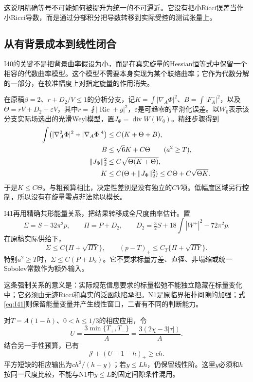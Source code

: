 \documentclass[UTF8,fontset=fandol,zihao=-4,a4paper]{ctexart}
\theoremstyle{remark}
\DeclareMathOperator{\Ric}{Ric}
\DeclareMathOperator{\diver}{div}
\newcommand{\J}{\mathcal J}
\newcommand{\avg}{\mathop{\fint}}
\begin{document}
这说明精确等号不可能如何被提升为统一的不可逼近。它没有把小Ricci误差当作小Ricci导数，而是通过分部积分把导数转移到实际受控的测试张量上。

\subsection{从有背景成本到线性闭合}

I40的关键不是把背景曲率假设为小，而是在真实旋量的Hessian恒等式中保留一个相容的代数曲率模型。这个模型不需要本身实现为某个联络曲率；它作为代数分解的一部分，在校准幅度上对指定旋量的作用消失。

在原稿$\beta=2$、$r+D_2/V\le1$的分析分支，记$K=\int|\nabla_A\Phi|^2$、$B=\int|F_A^-|^2$，以及$\Theta=rV+D_2+\varepsilon V$，其中$r=\avg|\Ric+g|^2$，$\varepsilon$是可趋零的平滑化误差。以$W_0$表示该分支实际场选出的光滑Weyl模型，置$J_\Phi=\diver W(W_0)$。精细步骤得到
\begin{align}
\int\bigl(|\nabla_A^2\Phi|^2+|\nabla_A\Phi|^4\bigr)
&\le C(K+\Theta+B),\notag\\
B&\le\sqrt6K+C\Theta\qquad(a^2\ge T),\notag\\
\|J_\Phi\|_2^2&\le C\sqrt{\Theta(K+\Theta)},\notag\\
K&\le C(\Theta+\|J_\Phi\|_2^2)\le C\Theta+C\sqrt{\Theta K}.
\label{eq:bootstrap}
\end{align}
于是$K\le C\Theta$。与粗预算相比，决定性差别是没有独立的$CV$项。低幅度区域另行控制，所以没有在旋量零点非法除以模长。

I41再用精确共形能量关系，把结果转移成全尺度曲率估计。置
\[
\Sigma=S-32\pi^2p,\qquad \Pi=P+D_2,
\qquad D_2=\tfrac32S+18\int|W^+|^2-72\pi^2p.
\]
在原稿实际供给下，
\begin{equation}
\boxed{\Sigma\le C\{\Pi+\sqrt{\Pi Y}\},\qquad
(p-T)_+\le C_T\{\Pi+\sqrt{\Pi Y}\}.}
\label{eq:I41}
\end{equation}
特别$a^2\ge T$时，$\Sigma\le C(P+D_2)$。它不要求标量方差、直径、非塌缩或统一Sobolev常数作为额外输入。

这条强制关系的意义是：实际规范信息要求的标量松弛不能独立隐藏在标量变化中；它必须由无迹Ricci和真实的泛函缺陷承担。N1是原临界拓扑间隙的加强；式\eqref{eq:I41}则保留能量变量并产生线性窗口，二者有不同的判断能力。

对$T=A(1-h)$、$0<h\le1/3$的相应应用，令
\[
U=\frac{3\min\{T_+,T_-\}}A
=\frac{3(2\chi-3|\tau|)}A.
\]
结合另一手性预算，已有
\begin{equation}
\boxed{\J+(U-1-h)_+\ge ch.}
\label{eq:linearwindow}
\end{equation}
平方短缺的相应输出为$c h^2/(h+y)$；若$y\le Lh$，仍保留线性阶。这里$y$必须和$h$按同一尺度比较，不能与N1中$y\le L$的固定间隙条件混用。
\end{document}
